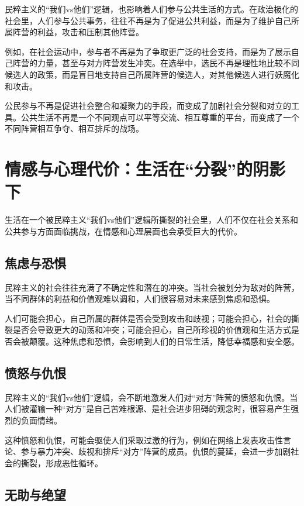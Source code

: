 民粹主义的“我们vs他们”逻辑，也影响着人们参与公共生活的方式。在政治极化的社会里，人们参与公共事务，往往不再是为了促进公共利益，而是为了维护自己所属阵营的利益，攻击和压制其他阵营。

例如，在社会运动中，参与者不再是为了争取更广泛的社会支持，而是为了展示自己阵营的力量，甚至与对方阵营发生冲突。在选举中，选民不再是理性地比较不同候选人的政策，而是盲目地支持自己所属阵营的候选人，对其他候选人进行妖魔化和攻击。

公民参与不再是促进社会整合和凝聚力的手段，而变成了加剧社会分裂和对立的工具。公共生活不再是一个不同观点可以平等交流、相互尊重的平台，而变成了一个不同阵营相互争夺、相互排斥的战场。

\section{情感与心理代价：生活在“分裂”的阴影下}

生活在一个被民粹主义“我们vs他们”逻辑所撕裂的社会里，人们不仅在社会关系和公共参与方面面临挑战，在情感和心理层面也会承受巨大的代价。

\subsection{焦虑与恐惧}

民粹主义的社会往往充满了不确定性和潜在的冲突。当社会被划分为敌对的阵营，当不同群体的利益和价值观难以调和，人们很容易对未来感到焦虑和恐惧。

人们可能会担心，自己所属的群体是否会受到攻击和歧视；可能会担心，社会的撕裂是否会导致更大的动荡和冲突；可能会担心，自己所珍视的价值观和生活方式是否会被颠覆。这种焦虑和恐惧，会影响到人们的日常生活，降低幸福感和安全感。

\subsection{愤怒与仇恨}

民粹主义的“我们vs他们”逻辑，会不断地激发人们对“对方”阵营的愤怒和仇恨。当人们被灌输一种“对方”是自己苦难根源、是社会进步阻碍的观念时，很容易产生强烈的负面情绪。

这种愤怒和仇恨，可能会驱使人们采取过激的行为，例如在网络上发表攻击性言论、参与暴力冲突、歧视和排斥“对方”阵营的成员。仇恨的蔓延，会进一步加剧社会的撕裂，形成恶性循环。

\subsection{无助与绝望}

